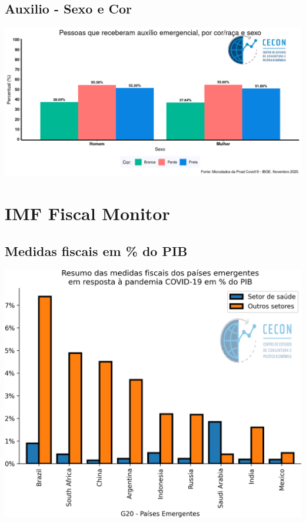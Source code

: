 \documentclass{SelfArx}
\begin{document}
\subsection*{Auxilio - Sexo e Cor}
\label{sec:org6db7271}
\begin{center}
\includegraphics[width=.9\linewidth]{./figs/PNAD_COVID/auxilio_cor_sexo.png}
\end{center}


\section*{IMF Fiscal Monitor}
\label{sec:org2e59a41}
\subsection*{Medidas fiscais em \% do PIB}
\label{sec:orgba73bc7}

\begin{center}
\includegraphics[width=.9\linewidth]{./figs/IMF/FiscalMonitor_Covid.png}
\end{center}
\end{document}
